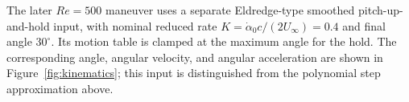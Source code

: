 The later $Re=500$ maneuver uses a separate Eldredge-type smoothed pitch-up-and-hold input, with nominal reduced rate $K=\dot\alpha_0c/(2U_\infty)=0.4$ and final angle $30^\circ$. Its motion table is clamped at the maximum angle for the hold. The corresponding angle, angular velocity, and angular acceleration are shown in Figure~\ref{fig:kinematics}; this input is distinguished from the polynomial step approximation above.

\FloatBarrier
